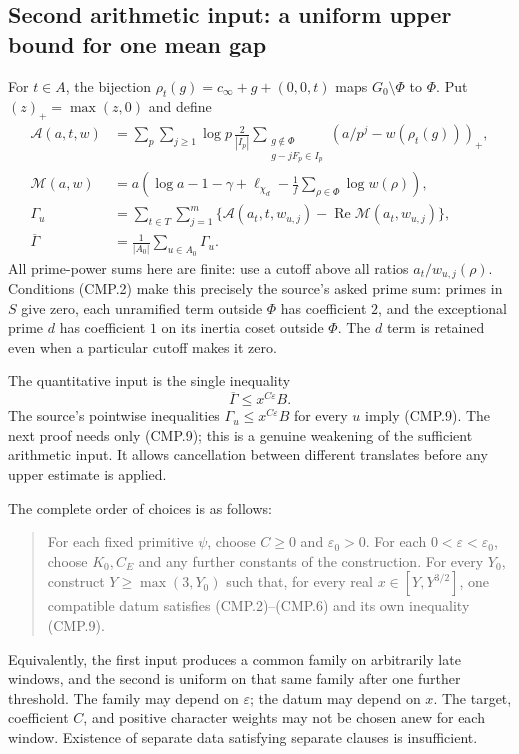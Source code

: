 \documentclass[11pt,a4paper]{article}
\numberwithin{equation}{section}
\theoremstyle{remark}\newtheorem{remark}[theorem]{Remark}
\begin{document}
\subsection{Second arithmetic input: a uniform upper bound for one mean gap}

For $t\in A$, the bijection
$\rho_t(g)=c_\infty+g+(0,0,\allowbreak{} t)$ maps $G_0\setminus\Phi$ to
$\Phi$.  Put $(z)_+=\max(z,0)$ and define
\begin{align*}
 \mathcal A(a,\allowbreak{} t,\allowbreak{} w)
 &=\sum_{p}\sum_{j\ge1}\log p\,
       \frac2{|I_p|}
       \sum_{\substack{g\notin\Phi\\g-jF_p\in I_p}}
                    (a/p^j-w(\rho_t(g)))_+,\\
 \mathcal M(a,\allowbreak{} w)
 &=a\left(\log a-1-\gamma+\ell_{\chi_d}
                         -\frac1f\sum_{\rho\in\Phi}\log w(\rho)\right),\\
 \Gamma_u
 &=\sum_{t\in T}\sum_{j=1}^m
       \{\mathcal A(a_t,\allowbreak{} t,\allowbreak{} w_{u,\allowbreak{} j})
                         -\operatorname{Re}\mathcal M(a_t,\allowbreak{} w_{u,\allowbreak{} j})\},\\
 \overline\Gamma&=\frac1{|A_0|}\sum_{u\in A_0}\Gamma_u.
                                                               \tag{CMP.8}
\end{align*}
All prime-power sums here are finite: use a cutoff above all ratios
$a_t/w_{u,\allowbreak{} j}(\rho)$.  Conditions (CMP.2) make this precisely the
source's asked prime sum: primes in $S$ give zero, each unramified
term outside $\Phi$ has coefficient $2$, and the exceptional prime
$d$ has coefficient $1$ on its inertia coset outside $\Phi$.
The $d$ term is retained even when a particular cutoff makes it zero.

The quantitative input is the single inequality
\[
                    \overline\Gamma\le x^{C\varepsilon}B.
 \tag{CMP.9}
\]
The source's pointwise inequalities $\Gamma_u\le x^{C\varepsilon}B$
for every $u$ imply (CMP.9).  The next proof needs only (CMP.9);
this is a genuine weakening of the sufficient arithmetic input.
It allows cancellation between different translates before any
upper estimate is applied.

The complete order of choices is as follows:
\begin{quote}
For each fixed primitive $\psi$, choose $C\ge0$ and
$\varepsilon_0>0$.  For each $0<\varepsilon<\varepsilon_0$,
choose $K_0,\allowbreak{} C_E$ and any further constants of the construction.
For every $Y_0$, construct $Y\ge\max(3,\allowbreak{} Y_0)$ such that, for
every real $x\in[Y,\allowbreak{} Y^{3/2}]$, one compatible datum satisfies
(CMP.2)--(CMP.6) and its own inequality (CMP.9).
\end{quote}
Equivalently, the first input produces a common family on
arbitrarily late windows, and the second is uniform on that same
family after one further threshold.  The family may depend on
$\varepsilon$; the datum may depend on $x$.  The target,
coefficient $C$, and positive character weights may not be chosen
anew for each window.  Existence of separate data satisfying
separate clauses is insufficient.
\end{document}

